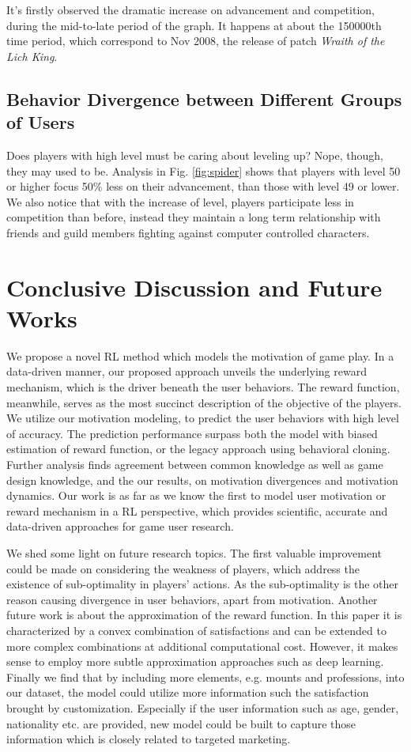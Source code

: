 \documentclass{sigchi}
\begin{document}
It's firstly observed the dramatic increase on advancement and competition, during the mid-to-late period of the graph.
It happens at about the 150000th time period, which correspond to Nov 2008, the release of patch \textit{Wraith of the Lich King}.


\subsection{Behavior Divergence between Different Groups of Users}

Does players with high level must be caring about leveling up?
Nope, though, they may used to be.
Analysis in Fig. \ref{fig:spider} shows that players with level 50 or higher focus 50\% less on their advancement, than those with level 49 or lower.
We also notice that with the increase of level, players participate less in competition than before, instead they maintain a long term relationship with friends and guild members fighting against computer controlled characters.


\section{Conclusive Discussion and Future Works}

We propose a novel RL method which models the motivation of game play.
In a data-driven manner, our proposed approach unveils the underlying reward mechanism, which is the driver beneath the user behaviors.
The reward function, meanwhile, serves as the most succinct description of the objective of the players.
We utilize our motivation modeling, to predict the user behaviors with high level of accuracy.
The prediction performance surpass both the model with biased estimation of reward function, or the legacy approach using behavioral cloning.
Further analysis finds agreement between common knowledge as well as game design knowledge, and the our results, on motivation divergences and motivation dynamics.
Our work is as far as we know the first to model user motivation or reward mechanism in a RL perspective, which provides scientific, accurate and data-driven approaches for game user research.

We shed some light on future research topics.
The first valuable improvement could be made on considering the weakness of players, which address the existence of sub-optimality in players' actions.
As the sub-optimality is the other reason causing divergence in user behaviors, apart from motivation.
Another future work is about the approximation of the reward function.
In this paper it is characterized by a convex combination of satisfactions and can be extended to more complex combinations at additional computational cost.
However, it makes sense to employ more subtle approximation approaches such as deep learning.
Finally we find that by including more elements, e.g. mounts and professions, into our dataset, the model could utilize more information such the satisfaction brought by customization.
Especially if the user information such as age, gender, nationality etc. are provided, new model could be built to capture those information which is closely related to targeted marketing.



\end{document}
